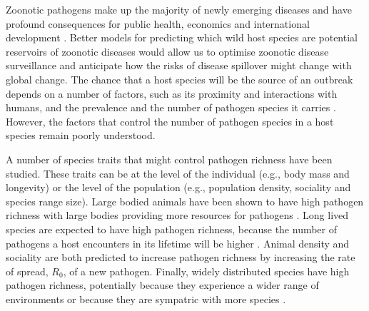 
Zoonotic pathogens make up the majority of newly emerging diseases and have profound consequences for public health, economics and international development \cite{jones2008global, smith2014global, ebolaWorldbank}.
Better models for predicting which wild host species are potential reservoirs of zoonotic diseases would allow us to optimise zoonotic disease surveillance and anticipate how the risks of disease spillover might change with global change.
The chance that a host species will be the source of an outbreak depends on a number of factors, such as its proximity and interactions with humans, and the prevalence and the number of pathogen species it carries \cite{wolfe2000deforestation}.
However, the factors that control the number of pathogen species in a host species remain poorly understood.





A number of species traits that might control pathogen richness have been studied.
These traits can be at the level of the individual (e.g., body mass and longevity) or the level of the population (e.g., population density, sociality and species range size).
Large bodied animals have been shown to have high pathogen richness with large bodies providing more resources for pathogens \cite{kamiya2014determines, arneberg2002host, poulin1995phylogeny, bordes2008bat, luis2013comparison}.
Long lived species are expected to have high pathogen richness, because the number of pathogens a host encounters in its lifetime will be higher \cite{nunn2003comparative, ezenwa2006host, luis2013comparison}.
Animal density \cite{kamiya2014determines, nunn2003comparative, arneberg2002host} and sociality \cite{bordes2007rodent, vitone2004body, altizer2003social, ezenwa2006host} are both predicted to increase pathogen richness by increasing the rate of spread, $R_0$, of a new pathogen.
Finally, widely distributed species have high pathogen richness, potentially because they experience a wider range of environments or because they are sympatric with more species \cite{kamiya2014determines, nunn2003comparative, luis2013comparison}.


